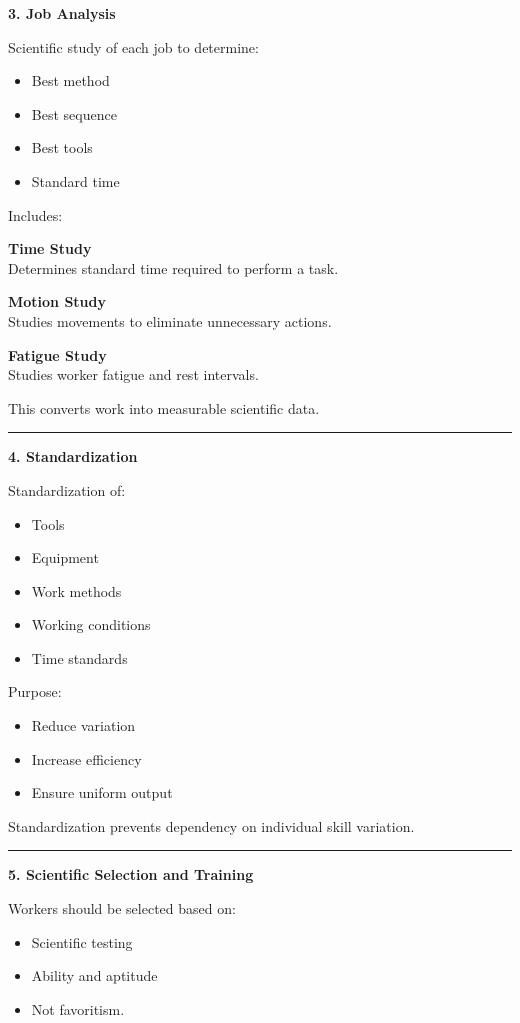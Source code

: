 \documentclass[10pt,a4paper]{article}
\newcommand{\separator}{\vspace{0.4em}\noindent\rule{\linewidth}{0.6pt}\vspace{0.4em}}
\begin{document}
\textbf{3. Job Analysis}

Scientific study of each job to determine:

\begin{itemize}
  \item Best method
  \item Best sequence
  \item Best tools
  \item Standard time
\end{itemize}

Includes:

\textbf{Time Study}\\
Determines standard time required to perform a task.

\textbf{Motion Study}\\
Studies movements to eliminate unnecessary actions.

\textbf{Fatigue Study}\\
Studies worker fatigue and rest intervals.

This converts work into measurable scientific data.

\separator

\textbf{4. Standardization}

Standardization of:

\begin{itemize}
  \item Tools
  \item Equipment
  \item Work methods
  \item Working conditions
  \item Time standards
\end{itemize}

Purpose:

\begin{itemize}
  \item Reduce variation
  \item Increase efficiency
  \item Ensure uniform output
\end{itemize}

Standardization prevents dependency on individual skill variation.

\separator

\textbf{5. Scientific Selection and Training}

Workers should be selected based on:

\begin{itemize}
  \item Scientific testing
  \item Ability and aptitude
  \item Not favoritism.
\end{itemize}
\end{document}
